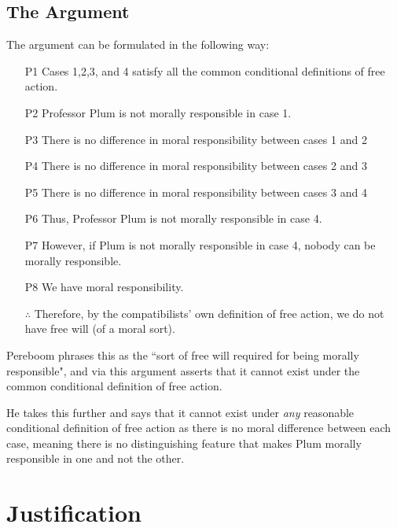 \documentclass{article}
\begin{document}
\subsection{The Argument}
The argument can be formulated in the following way:

\begin{enumerate}
    \item[P1] Cases 1,2,3, and 4 satisfy all the common conditional definitions of free action.
    \item[P2] Professor Plum is not morally responsible in case 1.
    \item[P3] There is no difference in moral responsibility between cases 1 and 2
    \item[P4] There is no difference in moral responsibility between cases 2 and 3
    \item[P5] There is no difference in moral responsibility between cases 3 and 4
    \item[P6] Thus, Professor Plum is not morally responsible in case 4.
    \item[P7] However, if Plum is not morally responsible in case 4, nobody can be morally responsible.
    \item[P8] We have moral responsibility.
    \item[$\therefore$] Therefore, by the compatibilists' own definition of free action, we do not have free will (of a moral sort).
\end{enumerate}

Pereboom phrases this as the ``sort of free will required for being morally responsible", and via this argument asserts that it cannot exist under the common conditional definition of free action.

He takes this further and says that it cannot exist under \emph{any} reasonable conditional definition of free action as there is no moral difference between each case, meaning there is no distinguishing feature that makes Plum morally responsible in one and not the other.

\section{Justification}
\end{document}
